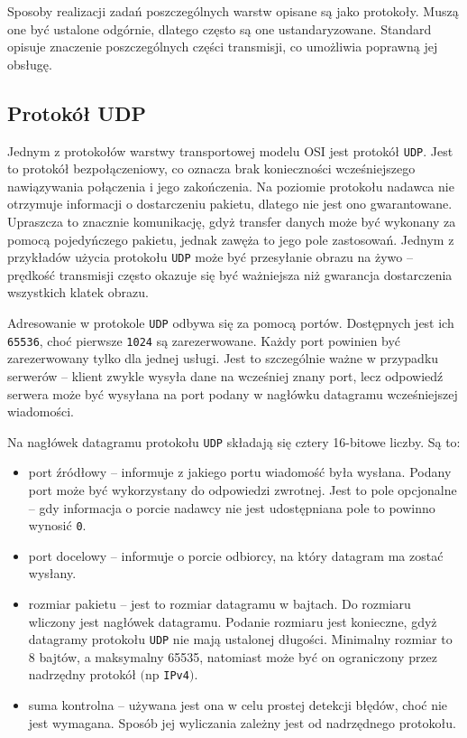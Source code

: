 \documentclass[a4paper, 11pt, twoside, openright]{article}
\begin{document}
	Sposoby realizacji zadań poszczególnych warstw opisane są jako protokoły. Muszą one być ustalone odgórnie, dlatego często są one ustandaryzowane.
	Standard opisuje znaczenie poszczególnych części transmisji, co umożliwia poprawną jej obsługę.

	\subsection{Protokół UDP}

	\indent\par
	Jednym z protokołów warstwy transportowej modelu OSI jest protokół \texttt{UDP}. Jest to protokół bezpołączeniowy, co oznacza brak konieczności wcześniejszego
	nawiązywania połączenia i jego zakończenia. Na poziomie protokołu nadawca nie otrzymuje informacji o dostarczeniu pakietu, dlatego nie jest ono
	gwarantowane. Upraszcza to znacznie komunikację, gdyż transfer danych może być wykonany za pomocą pojedyńczego pakietu, jednak zawęża to jego
	pole zastosowań. Jednym z przykładów użycia protokołu \texttt{UDP} może być przesyłanie obrazu na żywo -- prędkość transmisji często okazuje się być
	ważniejsza niż gwarancja dostarczenia wszystkich klatek obrazu.

	Adresowanie w protokole \texttt{UDP} odbywa się za pomocą portów. Dostępnych jest ich \texttt{65536}, choć pierwsze \texttt{1024} są zarezerwowane.
	Każdy port powinien być zarezerwowany tylko dla jednej usługi. Jest to szczególnie ważne w przypadku serwerów -- klient zwykle wysyła dane na wcześniej
	znany port, lecz odpowiedź serwera może być wysyłana na port podany w nagłówku datagramu wcześniejszej wiadomości.

	Na nagłówek datagramu protokołu \texttt{UDP} składają się cztery 16-bitowe liczby. Są to:
	\begin{itemize}
		\item port źródłowy -- informuje z jakiego portu wiadomość była wysłana. Podany port może być wykorzystany do odpowiedzi zwrotnej. Jest to pole
			opcjonalne -- gdy informacja o porcie nadawcy nie jest udostępniana pole to powinno wynosić \texttt{0}.
		\item port docelowy -- informuje o porcie odbiorcy, na który datagram ma zostać wysłany.
		\item rozmiar pakietu -- jest to rozmiar datagramu w bajtach. Do rozmiaru wliczony jest nagłówek datagramu. Podanie rozmiaru jest konieczne, gdyż
			datagramy protokołu \texttt{UDP} nie mają ustalonej długości. Minimalny rozmiar to 8 bajtów, a maksymalny 65535, natomiast może być on ograniczony
			przez nadrzędny protokół $($np \texttt{IPv4}$)$.
		\item suma kontrolna -- używana jest ona w celu prostej detekcji błędów, choć nie jest wymagana. Sposób jej wyliczania zależny jest od nadrzędnego protokołu.
	\end{itemize}
\end{document}
